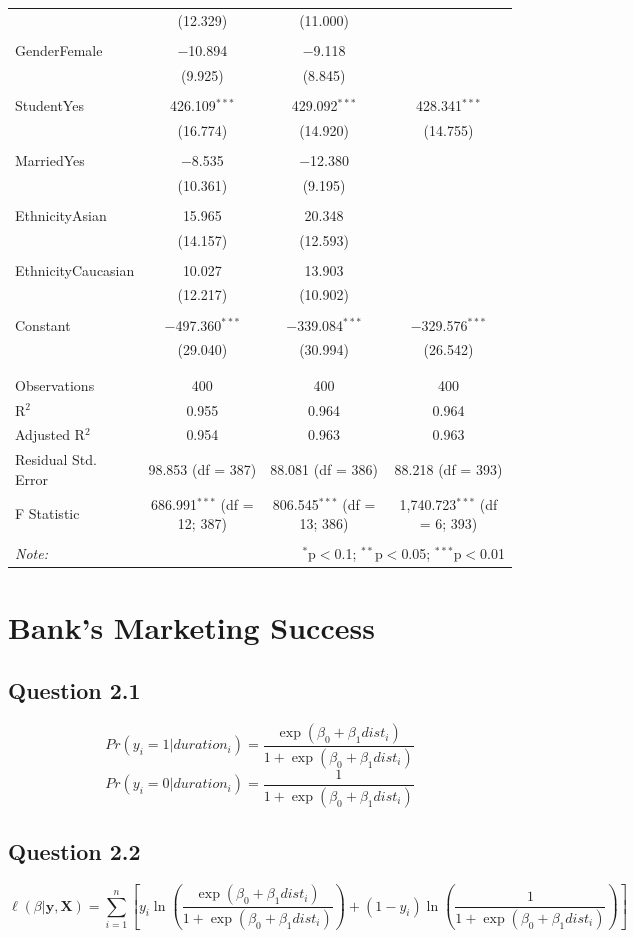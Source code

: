 \documentclass[11pt]{article}
\begin{document}
{\begin{table}[H]
{\begin{tabular}{@{\extracolsep{5pt}}lccc}
  & (12.329) & (11.000) &  \\ 
  & & & \\ 
 GenderFemale & $-$10.894 & $-$9.118 &  \\ 
  & (9.925) & (8.845) &  \\ 
  & & & \\ 
 StudentYes & 426.109$^{***}$ & 429.092$^{***}$ & 428.341$^{***}$ \\ 
  & (16.774) & (14.920) & (14.755) \\ 
  & & & \\ 
 MarriedYes & $-$8.535 & $-$12.380 &  \\ 
  & (10.361) & (9.195) &  \\ 
  & & & \\ 
 EthnicityAsian & 15.965 & 20.348 &  \\ 
  & (14.157) & (12.593) &  \\ 
  & & & \\ 
 EthnicityCaucasian & 10.027 & 13.903 &  \\ 
  & (12.217) & (10.902) &  \\ 
  & & & \\ 
 Constant & $-$497.360$^{***}$ & $-$339.084$^{***}$ & $-$329.576$^{***}$ \\ 
  & (29.040) & (30.994) & (26.542) \\ 
  & & & \\ 
\hline \\[-1.8ex] 
Observations & 400 & 400 & 400 \\ 
R$^{2}$ & 0.955 & 0.964 & 0.964 \\ 
Adjusted R$^{2}$ & 0.954 & 0.963 & 0.963 \\ 
Residual Std. Error & 98.853 (df = 387) & 88.081 (df = 386) & 88.218 (df = 393) \\ 
F Statistic & 686.991$^{***}$ (df = 12; 387) & 806.545$^{***}$ (df = 13; 386) & 1,740.723$^{***}$ (df = 6; 393) \\ 
\hline 
\hline \\[-1.8ex] 
\textit{Note:}  & \multicolumn{3}{r}{$^{*}$p$<$0.1; $^{**}$p$<$0.05; $^{***}$p$<$0.01} \\ 
\end{tabular} 
}
\end{table}


\section*{Bank's Marketing Success}
\subsection*{Question 2.1}
$$Pr(y_i = 1|duration_i) = \frac{\exp(\beta_0+\beta_1dist_i)}{1+\exp(\beta_0+\beta_1dist_i)}$$ 
$$Pr(y_i = 0|duration_i) = \frac{1}{1+\exp(\beta_0+\beta_1dist_i)}$$ 


\subsection*{Question 2.2}
$$\ell(\beta|\mathbf{y},\mathbf{X}) = \sum\limits_{i=1}^n \left[ y_i \ln{\left( \frac{\exp(\beta_0+\beta_1dist_i)}{1+\exp(\beta_0+\beta_1dist_i)}\right)} + (1-y_i) \ln{\left( \frac{1}{1+\exp(\beta_0+\beta_1dist_i)}\right)}\right]$$


}
\end{document}

